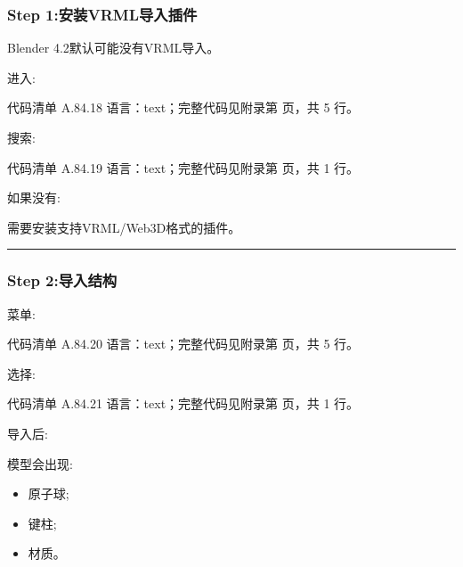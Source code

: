 \documentclass[lang=cn,scheme=chinese,color=blue,device=normal,toc=onecol,math=cm]{elegantbook}
\begin{document}
\subsubsection{Step 1:安装VRML导入插件}


Blender 4.2默认可能没有VRML导入。\par


进入:\par


\begin{codeindexbox}{代码清单 A.84.18}
语言：text；完整代码见附录第 \pageref{code:84:18} 页，共 5 行。
\end{codeindexbox}


搜索:\par


\begin{codeindexbox}{代码清单 A.84.19}
语言：text；完整代码见附录第 \pageref{code:84:19} 页，共 1 行。
\end{codeindexbox}


如果没有:\par


需要安装支持VRML/\allowbreak{}Web3D格式的插件。\par


\medskip\hrule\medskip


\subsubsection{Step 2:导入结构}


菜单:\par


\begin{codeindexbox}{代码清单 A.84.20}
语言：text；完整代码见附录第 \pageref{code:84:20} 页，共 5 行。
\end{codeindexbox}


选择:\par


\begin{codeindexbox}{代码清单 A.84.21}
语言：text；完整代码见附录第 \pageref{code:84:21} 页，共 1 行。
\end{codeindexbox}


导入后:\par


模型会出现:\par


\begin{itemize}
\item 原子球;
\item 键柱;
\item 材质。
\end{itemize}
\end{document}
